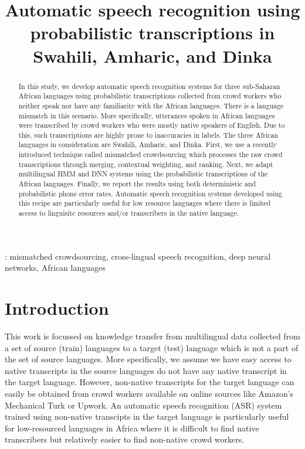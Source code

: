 \documentclass[a4paper]{article}
\title{Automatic speech recognition using probabilistic transcriptions in Swahili, Amharic, and Dinka}
\begin{document}
\maketitle

\begin{abstract}
In this study, we develop automatic speech recognition systems for three sub-Saharan African languages
using probabilistic transcriptions collected from crowd workers who neither speak nor have any familiarity 
with the African languages. There is a language mismatch in this scenario. More specifically, utterances spoken in African languages were transcribed by crowd workers who were mostly native speakers of English. Due to this, such transcriptions are highly prone to inaccuracies in labels. The three African languages in consideration are Swahili, Amharic, and Dinka. First, we use a recently introduced technique called mismatched crowdsourcing which processes the raw crowd transcriptions through merging, contextual weighting, and ranking. Next, we  adapt multilingual HMM and DNN systems using the probabilistic transcriptions of the African languages.  Finally, we report the results using both deterministic and probabilistic phone error rates. Automatic speech recognition systems developed using this recipe are particularly useful for low resource languages where there is limited access to linguisitc resources and/or transcribers in the native language.
\end{abstract}
%
: mismatched crowdsourcing, cross-lingual speech recognition, deep neural networks,
African languages
\vspace{-3mm}
%
\section{Introduction}  \vspace{-2mm}
\label{sec:Introduction}
This work is focussed on knowledge transfer from multilingual data collected from a set of source (train) languages to a target (test) language which is not a part of the set of source languages. More specifically, we assume we have easy access to native transcripts in the source languages do not have any native transcript in the target language. However, non-native transcripts for the target language can easily be obtained from crowd workers available on online sources like Amazon's Mechanical Turk or Upwork. An automatic speech recognition (ASR) system trained using non-native transcipts in the target language is particularly useful for low-resourced languages in Africa where it is difficult to find native transcribers but relatively easier to find non-native crowd workers. 
\end{document}
